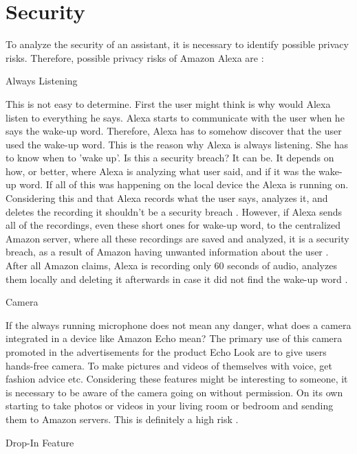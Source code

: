 \documentclass[
  digital, %
  oneside, %
  table,   %
  lof,     %
  lot,     %
]{fithesis3}
\begin{document}
\section{Security}
To analyze the security of an assistant, it is necessary to identify possible privacy risks. Therefore, possible privacy risks of Amazon Alexa are \parencite{alexa_risks}:
\begin{compactitem}
  \item Always Listening
  
This is not easy to determine. First the user might think is why would Alexa listen to everything he says. Alexa starts to communicate with the user when he says the wake-up word. Therefore, Alexa has to somehow discover that the user used the wake-up word. This is the reason why Alexa is always listening. She has to know when to 'wake up'. Is this a security breach? It can be. It depends on how, or better, where Alexa is analyzing what user said, and if it was the wake-up word. If all of this was happening on the local device the Alexa is running on. Considering this and that Alexa records what the user says, analyzes it, and deletes the recording it shouldn't be a security breach \parencite{alexa_risks}. However, if Alexa sends all of the recordings, even these short ones for wake-up word, to the centralized Amazon server, where all these recordings are saved and analyzed, it is a security breach, as a result of Amazon having unwanted information about the user \parencite{alexa_listening} \parencite{alexa_listening2}. After all Amazon claims, Alexa is recording only 60 seconds of audio, analyzes them locally and deleting it afterwards in case it did not find the wake-up word \parencite{alexa_palmer}.

  \item Camera
  
If the always running microphone does not mean any danger, what does a camera integrated in a device like Amazon Echo mean? The primary  use of this camera promoted in the advertisements for the product Echo Look are to give users hands-free camera. To make pictures and videos of themselves with voice, get fashion advice etc. Considering these features might be interesting to someone, it is necessary to be aware of the camera going on without permission. On its own starting to take photos or videos in your living room or bedroom and sending them to Amazon servers. This is definitely a high risk \parencite{alexa_camera}.

  \item Drop-In Feature
  

\end{compactitem}
\end{document}
